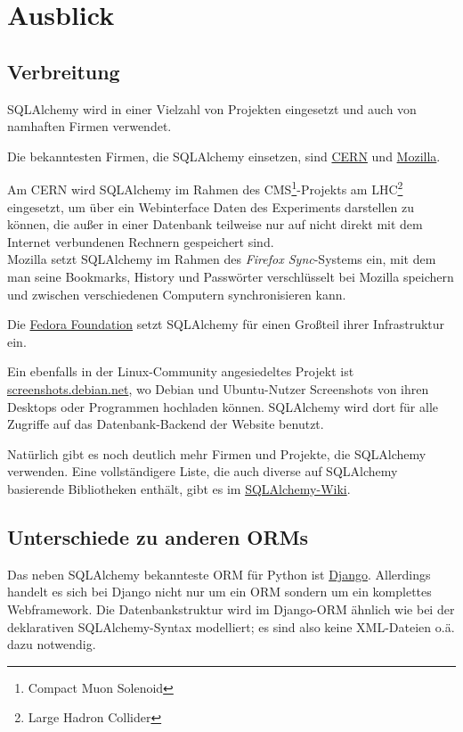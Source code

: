 \chapter{Ausblick}

\section{Verbreitung}

SQLAlchemy wird in einer Vielzahl von Projekten eingesetzt und auch von
namhaften Firmen verwendet.

Die bekanntesten Firmen, die SQLAlchemy einsetzen, sind
\href{http://www.cern.ch}{CERN} und
\href{http://www.mozilla.com}{Mozilla}.

Am CERN wird SQLAlchemy im Rahmen des CMS\footnote{Compact Muon
Solenoid}-Projekts am LHC\footnote{Large Hadron Collider} eingesetzt, um über
ein Webinterface Daten des Experiments darstellen zu können, die außer in einer
Datenbank teilweise nur auf nicht direkt mit dem Internet verbundenen Rechnern
gespeichert sind. \\
Mozilla setzt SQLAlchemy im Rahmen des \emph{Firefox Sync}-Systems ein, mit dem
man seine Bookmarks, History und Passwörter verschlüsselt bei Mozilla speichern
und zwischen verschiedenen Computern synchronisieren kann.

Die \href{http://fedoraproject.org/wiki/Infrastructure/Services}{Fedora
Foundation} setzt SQLAlchemy für einen Großteil ihrer Infrastruktur ein.

Ein ebenfalls in der Linux-Community angesiedeltes Projekt ist
\href{http://screenshots.debian.net/}{screenshots.debian.net}, wo Debian
und Ubuntu-Nutzer Screenshots von ihren Desktops oder Programmen hochladen
können. SQLAlchemy wird dort für alle Zugriffe auf das Datenbank-Backend der
Website benutzt.

Natürlich gibt es noch deutlich mehr Firmen und Projekte, die SQLAlchemy
verwenden. Eine vollständigere Liste, die auch diverse auf SQLAlchemy basierende
Bibliotheken enthält, gibt es im
\href{http://www.sqlalchemy.org/trac/wiki/SAApps}{SQLAlchemy-Wiki}.


\section{Unterschiede zu anderen ORMs}

Das neben SQLAlchemy bekannteste ORM für Python ist
\href{http://www.djangoproject.com/}{Django}. Allerdings handelt es sich bei
Django nicht nur um ein ORM sondern um ein komplettes Webframework. Die
Datenbankstruktur wird im Django-ORM ähnlich wie bei der deklarativen
SQLAlchemy-Syntax modelliert; es sind also keine XML-Dateien o.ä. dazu
notwendig.

